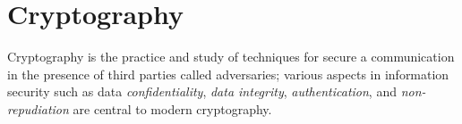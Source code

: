 \chapter{Cryptography}

Cryptography is the practice and study of techniques for secure a communication in the presence of third parties called adversaries; various aspects in information security such as data \textit{confidentiality}, \textit{data integrity}, \textit{authentication}, and \textit{non-repudiation} are central to modern cryptography.\newline\newline
